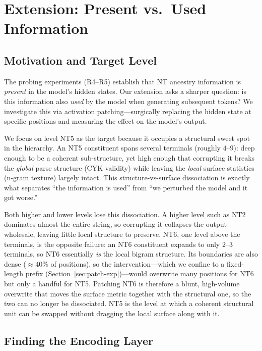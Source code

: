 \documentclass[10pt,twocolumn]{article}
\begin{document}
\section{Extension: Present vs.\ Used Information}
\label{sec:extension}

\subsection{Motivation and Target Level}

The probing experiments (R4--R5) establish that NT ancestry information is \emph{present} in the model's hidden states. Our extension asks a sharper question: is this information also \emph{used} by the model when generating subsequent tokens? We investigate this via activation patching—surgically replacing the hidden state at specific positions and measuring the effect on the model's output.

We focus on level NT5 as the target because it occupies a structural sweet spot in the hierarchy. An NT5 constituent spans several terminals (roughly $4$--$9$): deep enough to be a coherent sub-structure, yet high enough that corrupting it breaks the \emph{global} parse structure (CYK validity) while leaving the \emph{local} surface statistics (n-gram texture) largely intact. This structure-vs-surface dissociation is exactly what separates ``the information is used'' from ``we perturbed the model and it got worse.''

Both higher and lower levels lose this dissociation. A higher level such as NT2 dominates almost the entire string, so corrupting it collapses the output wholesale, leaving little local structure to preserve. NT6, one level above the terminals, is the opposite failure: an NT6 constituent expands to only $2$--$3$ terminals, so NT6 essentially \emph{is} the local bigram structure. Its boundaries are also dense (${\approx}40\%$ of positions), so the intervention---which we confine to a fixed-length prefix (Section~\ref{sec:patch-exp})---would overwrite many positions for NT6 but only a handful for NT5. Patching NT6 is therefore a blunt, high-volume overwrite that moves the surface metric together with the structural one, so the two can no longer be dissociated. NT5 is the level at which a coherent structural unit can be swapped without dragging the local surface along with it.

\subsection{Finding the Encoding Layer}
\end{document}
